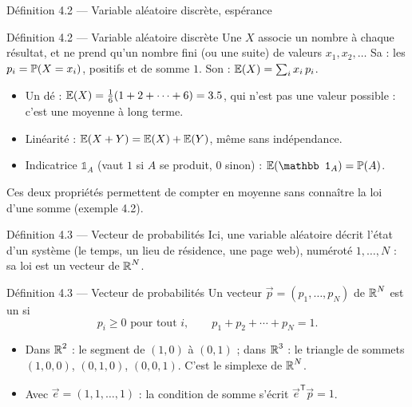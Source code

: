 \begin{frame}{Définition 4.2 --- Variable aléatoire discrète, espérance}
  \begin{Enonce}{Définition 4.2 --- Variable aléatoire discrète}
    \small Une  $X$ associe un nombre à
    chaque résultat, et ne prend qu'un nombre fini (ou une suite) de
    valeurs $x_1,x_2,\dots$ Sa  : les $p_i=\P{X=x_i}$, positifs
    et de somme $1$. Son  :
    $\Es{X} = \sum_i x_i\,p_i$.
  \end{Enonce}
  \small
  \begin{itemize}
    \item Un dé : $\Es{X}=\tfrac16(1+2+\cdots+6)=\num{3.5}$, qui n'est pas
      une valeur possible : c'est une moyenne à long terme.
    \item Linéarité : $\Es{X+Y}=\Es{X}+\Es{Y}$, même sans indépendance.
    \item Indicatrice $\mathbb 1_A$ (vaut $1$ si $A$ se produit, $0$
      sinon) : $\Es{\mathbb 1_A}=\P{A}$.
  \end{itemize}
  Ces deux propriétés permettent de compter en moyenne sans connaître la
  loi d'une somme (exemple 4.2).
\end{frame}

\begin{frame}{Définition 4.3 --- Vecteur de probabilités}
  \small Ici, une variable aléatoire décrit l'état d'un système (le
  temps, un lieu de résidence, une page web), numéroté $1,\dots,N$ : sa
  loi est un vecteur de $\R^N$.
  \begin{Enonce}{Définition 4.3 --- Vecteur de probabilités}
    Un vecteur $\vec p=(p_1,\dots,p_N)$ de $\R^N$ est un  si
    \[
      p_i\geq0 \text{ pour tout } i, \qquad p_1+p_2+\cdots+p_N = 1.
    \]
  \end{Enonce}
  \small
  \begin{itemize}
    \item Dans $\R^2$ : le segment de $(1,0)$ à $(0,1)$ ; dans $\R^3$ : le
      triangle de sommets $(1,0,0)$, $(0,1,0)$, $(0,0,1)$. C'est le
      simplexe de $\R^N$.
    \item Avec $\vec e=(1,1,\dots,1)$ : la condition de somme s'écrit
      $\vec e^{\mathsf T}\vec p=1$.
  \end{itemize}
\end{frame}

